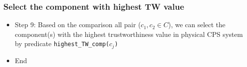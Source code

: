 \documentclass{beamer}
\begin{document}

\begin{frame}[fragile]
	\frametitle{Select the component with highest TW value}
	\begin{itemize}
		\item Step 9: Based on the comparison all pair ($c_1, c_2 \in C$), we can select the component(s) with the highest trustworthiness value in physical CPS system by predicate {\tt highest\_TW\_comp($c_j$)}
		\item End
	\end{itemize}
	
\end{frame}
\end{document}
